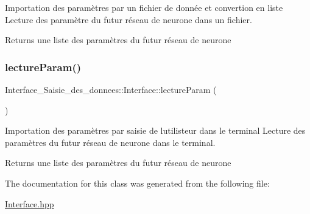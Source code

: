 Importation des paramètres par un fichier de donnée et convertion en liste Lecture des paramètre du futur réseau de neurone dans un fichier. 

\begin{DoxyReturn}{Returns}
une liste des paramètres du futur réseau de neurone 
\end{DoxyReturn}
\mbox{\label{class_interface___saisie__des__donnees_1_1_interface_a290c3761a31998630c1245c8a4b7ef5a}} 
\subsubsection{\texorpdfstring{lecture\+Param()}{lectureParam()}}
{\footnotesize\ttfamily Interface\+\_\+\+Saisie\+\_\+des\+\_\+donnees\+::\+Interface\+::lecture\+Param (\begin{DoxyParamCaption}{ }\end{DoxyParamCaption})}



Importation des paramètres par saisie de l\textquotesingle{}utilisteur dans le terminal Lecture des paramètres du futur réseau de neurone dans le terminal. 

\begin{DoxyReturn}{Returns}
une liste des paramètres du futur réseau de neurone 
\end{DoxyReturn}


The documentation for this class was generated from the following file\+:\begin{DoxyCompactItemize}
\item 
\hyperlink{_interface_8hpp}{Interface.\+hpp}\end{DoxyCompactItemize}
